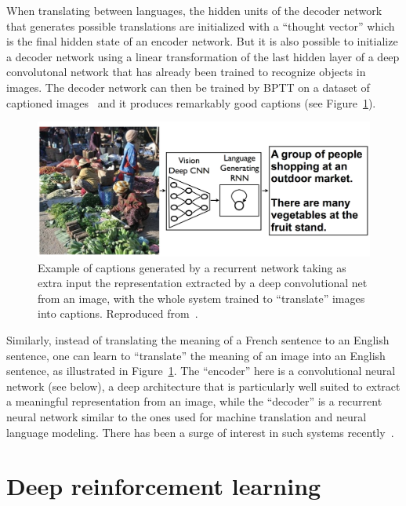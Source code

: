 \documentclass[]{article}
\begin{document}
When translating between languages, the hidden units of the decoder network
that generates possible translations are initialized with a ``thought
vector'' which is the final hidden state of an encoder network.  But it is
also possible to initialize a decoder network using a linear transformation
of the last hidden layer of a deep convolutonal network that has already
been trained to recognize objects in images. The decoder network can then
be trained by BPTT on a dataset of captioned
images~\citep{NIC,StanfordNIC,more?} and it produces remarkably good
captions (see Figure~\ref{fig:caption-generation}).

\begin{figure}[ht]
\centerline{\includegraphics[width=\linewidth]{caption-generation-Vinyals-et-al.png}}
\caption{Example of captions generated by a recurrent network taking
as extra input the representation extracted by a deep convolutional
net from an image, with the whole system trained to ``translate''
images into captions. Reproduced from~\citet{Vinyals-et-al-arxiv2014}.
}
\label{fig:caption-generation}
\end{figure}

Similarly, instead of translating the meaning of a French sentence to an English sentence,
one can learn to ``translate'' the meaning of an image into an English sentence,
as illustrated in Figure~\ref{fig:caption-generation}. The ``encoder'' here is
a convolutional neural network (see below), a deep architecture that is particularly
well suited to extract a meaningful representation from an image, while the ``decoder''
is a recurrent neural network similar to the ones used for machine translation
and neural language modeling. There has been a surge of interest in such
systems recently~\citep{Vinyals-et-al-arxiv2014,OTHER-CAPTION-GENERATION-PAPERS}.


\section{Deep reinforcement learning}
\end{document}
